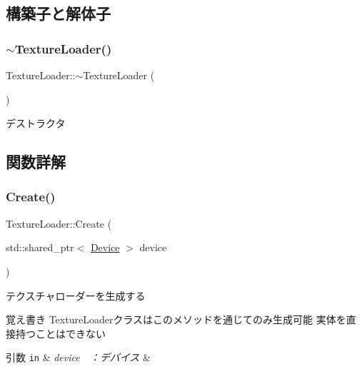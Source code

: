 \subsection{構築子と解体子}
\mbox{\label{class_texture_loader_aee3a49f73e5f88890658b17e9896c4f2}} 
\subsubsection{\texorpdfstring{$\sim$\+Texture\+Loader()}{~TextureLoader()}}
{\footnotesize\ttfamily Texture\+Loader\+::$\sim$\+Texture\+Loader (\begin{DoxyParamCaption}{ }\end{DoxyParamCaption})}



デストラクタ 



\subsection{関数詳解}
\mbox{\label{class_texture_loader_a60cad37b407b057692af03224c60bc18}} 
\subsubsection{\texorpdfstring{Create()}{Create()}}
{\footnotesize\ttfamily Texture\+Loader\+::\+Create (\begin{DoxyParamCaption}\item[{std\+::shared\+\_\+ptr$<$ \mbox{\hyperlink{class_device}{Device}} $>$}]{device }\end{DoxyParamCaption})\hspace{0.3cm}{\ttfamily [static]}}

テクスチャローダーを生成する \begin{DoxyNote}{覚え書き}
Texture\+Loaderクラスはこのメソッドを通じてのみ生成可能 実体を直接持つことはできない 
\end{DoxyNote}

\begin{DoxyParams}[1]{引数}
\mbox{\tt in}  & {\em device　：デバイス} & \\
\hline
\end{DoxyParams}
\mbox{\label{class_texture_loader_a9aefce2fb588949ce0103ea35a046dda}} 
